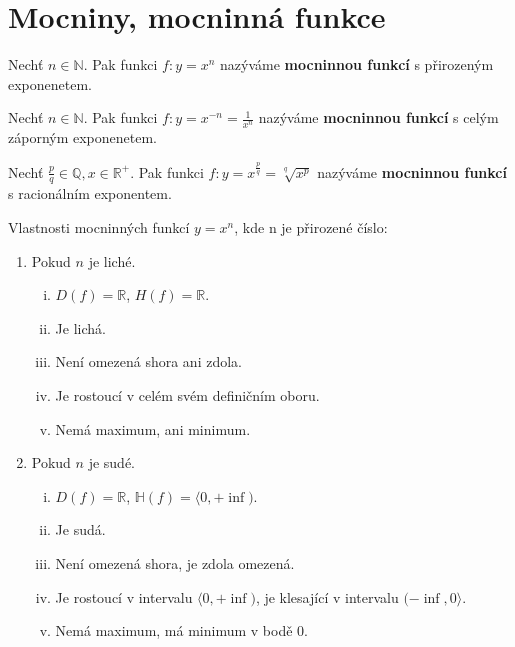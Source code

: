 \section{Mocniny, mocninná funkce}
\begin{definition}
    Nechť $n\in \mathbb N.$ Pak funkci $f: y=x^n$ nazýváme \textbf{mocninnou funkcí}
    s přirozeným exponenetem.
\end{definition}

\begin{definition}
    Nechť $n\in \mathbb N.$ Pak funkci $f: y=x^{-n}=\frac{1}{x^n}$ nazýváme
    \textbf{mocninnou funkcí} s celým záporným exponenetem.
\end{definition}

\begin{definition}
    Nechť $\frac{p}{q}\in \mathbb Q, x \in \mathbb R^+.$ Pak funkci $f: y=
    x^{\frac{p}{q}}=\sqrt[q]{x^p}$ nazýváme \textbf{mocninnou funkcí}
    s racionálním exponentem.
\end{definition}

\begin{veta}
  Vlastnosti mocninných funkcí $y= x^n$, kde n je přirozené číslo:
  \begin{enumerate}[1.]
    \item Pokud $n$ je liché.
    \begin{enumerate}[i.]
      \item $D(f)= \mathbb R$, $H(f)= \mathbb R$.
      \item Je lichá.
      \item Není omezená shora ani zdola.
      \item Je rostoucí v celém svém definičním oboru.
      \item Nemá maximum, ani minimum.
    \end{enumerate}
    \item Pokud $n$ je sudé.
    \begin{enumerate}[i.]
      \item $D(f)= \mathbb R$, $\mathbb H(f)= \langle 0,+\inf )$.
      \item Je sudá.
      \item Není omezená shora, je zdola omezená.
      \item Je rostoucí v intervalu $\langle 0,+\inf )$, je klesající v intervalu $( -\inf,0 \rangle $.
      \item Nemá maximum, má minimum v bodě $0$.
    \end{enumerate}
  \end{enumerate}
\end{veta}

